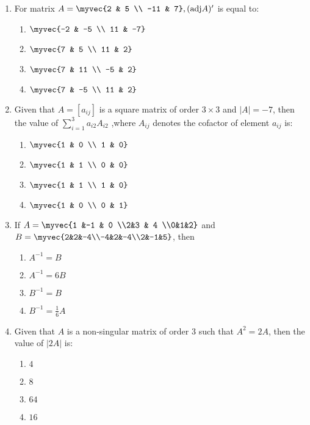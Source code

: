 \documentclass{article}
\begin{document}
\begin{enumerate}
    \item For matrix $A = \myvec{2 & 5 \\ -11 & 7}, (\text{adj}A)'$ is equal to:
    \begin{enumerate}
        \item $\myvec{-2 & -5 \\ 11 & -7}$
        \item $\myvec{7 & 5 \\ 11 & 2}$
        \item $\myvec{7 & 11 \\ -5 & 2}$
        \item $\myvec{7 & -5 \\ 11 & 2}$
    \end{enumerate}

    \item Given that $A = [a_{ij}]$ is a square matrix of order $3 \times 3$ and $|A| = -7$, then the value of  $\sum_{i=1}^{3} a_{i2}A_{i2}$ ,where $A_{ij}$ denotes the cofactor of element $a_{ij}$ is:

    \begin{enumerate}
        \item $\myvec{1 & 0 \\ 1 & 0}$
        \item $ \myvec{1 & 1 \\ 0 & 0}$
        \item $\myvec{1 & 1 \\ 1 & 0}$
        \item $\myvec{1 & 0 \\ 0 & 1}$
    \end{enumerate}

    
    \item If $A =\myvec{1 &-1 & 0 \\2&3 & 4 \\0&1&2}$ and $B = \myvec{2&2&-4\\-4&2&-4\\2&-1&5}$, then
    \begin{enumerate}
        \item $A^{-1} = B$
        \item $A^{-1} = 6B$
        \item $B^{-1} = B$
        \item $B^{-1} = \frac{1}{6} A$
    \end{enumerate}
    \item Given that $A$ is a non-singular matrix of order $3$ such that $A^2 = 2A$, then the value of $|2A|$ is:
    \begin{enumerate}
        \item $4$
        \item $8$
        \item $64$
        \item $16$
    \end{enumerate}
    

\end{enumerate}
\end{document}
